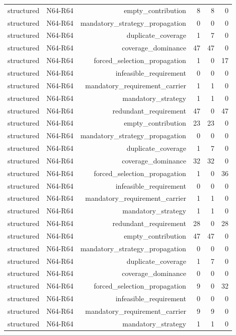 {\begin{longtable}{lrrrrr}
structured & N64-R64 & empty\_contribution & 8 & 8 & 0 \\
structured & N64-R64 & mandatory\_strategy\_propagation & 0 & 0 & 0 \\
structured & N64-R64 & duplicate\_coverage & 1 & 7 & 0 \\
structured & N64-R64 & coverage\_dominance & 47 & 47 & 0 \\
structured & N64-R64 & forced\_selection\_propagation & 1 & 0 & 17 \\
structured & N64-R64 & infeasible\_requirement & 0 & 0 & 0 \\
structured & N64-R64 & mandatory\_requirement\_carrier & 1 & 1 & 0 \\
structured & N64-R64 & mandatory\_strategy & 1 & 1 & 0 \\
structured & N64-R64 & redundant\_requirement & 47 & 0 & 47 \\
structured & N64-R64 & empty\_contribution & 23 & 23 & 0 \\
structured & N64-R64 & mandatory\_strategy\_propagation & 0 & 0 & 0 \\
structured & N64-R64 & duplicate\_coverage & 1 & 7 & 0 \\
structured & N64-R64 & coverage\_dominance & 32 & 32 & 0 \\
structured & N64-R64 & forced\_selection\_propagation & 1 & 0 & 36 \\
structured & N64-R64 & infeasible\_requirement & 0 & 0 & 0 \\
structured & N64-R64 & mandatory\_requirement\_carrier & 1 & 1 & 0 \\
structured & N64-R64 & mandatory\_strategy & 1 & 1 & 0 \\
structured & N64-R64 & redundant\_requirement & 28 & 0 & 28 \\
structured & N64-R64 & empty\_contribution & 47 & 47 & 0 \\
structured & N64-R64 & mandatory\_strategy\_propagation & 0 & 0 & 0 \\
structured & N64-R64 & duplicate\_coverage & 1 & 7 & 0 \\
structured & N64-R64 & coverage\_dominance & 0 & 0 & 0 \\
structured & N64-R64 & forced\_selection\_propagation & 9 & 0 & 32 \\
structured & N64-R64 & infeasible\_requirement & 0 & 0 & 0 \\
structured & N64-R64 & mandatory\_requirement\_carrier & 9 & 9 & 0 \\
structured & N64-R64 & mandatory\_strategy & 1 & 1 & 0 \\

\end{longtable}}
